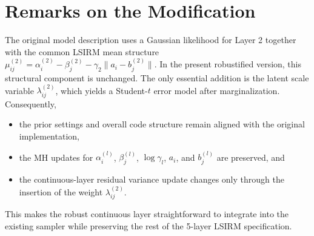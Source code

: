 \documentclass[11pt]{article}
\begin{document}
\section{Remarks on the Modification}

The original model description uses a Gaussian likelihood for Layer 2 together with the common LSIRM mean structure $\mu_{ij}^{(2)} = \alpha_i^{(2)} - \beta_j^{(2)} - \gamma_2\|a_i-b_j^{(2)}\|$. In the present robustified version, this structural component is unchanged. The only essential addition is the latent scale variable $\lambda_{ij}^{(2)}$, which yields a Student-$t$ error model after marginalization. Consequently,
\begin{itemize}[leftmargin=1.5em]
    \item the prior settings and overall code structure remain aligned with the original implementation,
    \item the MH updates for $\alpha_i^{(l)}$, $\beta_j^{(l)}$, $\log \gamma_l$, $a_i$, and $b_j^{(l)}$ are preserved, and
    \item the continuous-layer residual variance update changes only through the insertion of the weight $\lambda_{ij}^{(2)}$.
\end{itemize}
This makes the robust continuous layer straightforward to integrate into the existing sampler while preserving the rest of the 5-layer LSIRM specification.
\end{document}
